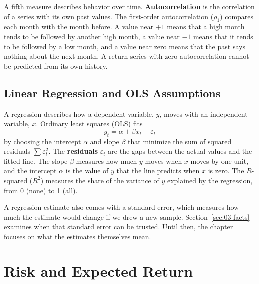A fifth measure describes behavior over time. \textbf{Autocorrelation} is the correlation of a series with its own past values. The first-order autocorrelation ($\rho_1$) compares each month with the month before. A value near $+1$ means that a high month tends to be followed by another high month, a value near $-1$ means that it tends to be followed by a low month, and a value near zero means that the past says nothing about the next month. A return series with zero autocorrelation cannot be predicted from its own history.

\subsection{Linear Regression and OLS Assumptions}
\label{sec:03-regression}
A regression describes how a dependent variable, $y$, moves with an independent variable, $x$. Ordinary least squares (OLS) fits
\begin{equation}
  y_t = \alpha + \beta x_t + \varepsilon_t
  \label{eq:03-ols}
\end{equation}
by choosing the intercept $\alpha$ and slope $\beta$ that minimize the sum of squared residuals $\sum \varepsilon_t^2$. The \textbf{residuals} $\varepsilon_t$ are the gaps between the actual values and the fitted line. The slope $\beta$ measures how much $y$ moves when $x$ moves by one unit, and the intercept $\alpha$ is the value of $y$ that the line predicts when $x$ is zero. The $R$-squared ($R^2$) measures the share of the variance of $y$ explained by the regression, from 0 (none) to 1 (all).

A regression estimate also comes with a standard error, which measures how much the estimate would change if we drew a new sample. Section~\ref{sec:03-facts} examines when that standard error can be trusted. Until then, the chapter focuses on what the estimates themselves mean.

\section{Risk and Expected Return}
\label{sec:03-decomposition}


